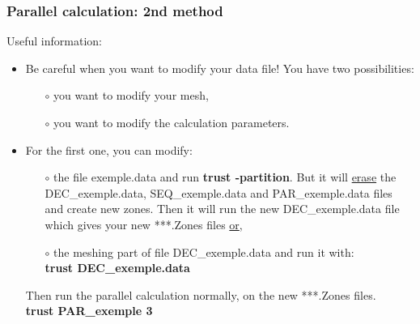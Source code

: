 \documentclass[10pt, hyperref={unicode=true,pdfusetitle, bookmarks=true,bookmarksnumbered=false,bookmarksopen=false, breaklinks=false,pdfborder={0 0 1},backref=true,colorlinks=true,linkcolor=darkblue,pageanchor}]{beamer}
\begin{document}
\begin{frame}
\frametitle{Parallel calculation: 2nd method}
\begin{block}{Useful information:}

\begin{itemize}
\item Be careful when you want to modify your data file! You have two possibilities:
    \begin{itemize} 
    \item [$\circ$] you want to modify your mesh,
    \item [$\circ$] you want to modify the calculation parameters.
    \end{itemize}

\item For the first one, you can modify:
    \begin{itemize} 
    \item [$\circ$] the file exemple.data and run \textbf{trust -partition}. But it will \underline{erase} the DEC\_exemple.data, SEQ\_exemple.data and PAR\_exemple.data files and create new zones. Then it will run the new DEC\_exemple.data file which gives your new ***.Zones files \underline{or},
    \item [$\circ$] the meshing part of file DEC\_exemple.data and run it with:\\
    \textbf{trust DEC\_exemple.data} \\
    \end{itemize}
Then run the parallel calculation normally, on the new ***.Zones files.\\
\textbf{trust PAR\_exemple 3}

\end{itemize}

\end{block}
\end{frame}
\end{document}
